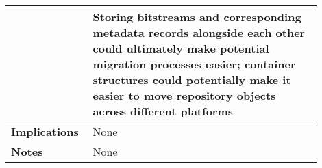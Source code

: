 \begin{longtable}{
>{\arraybackslash}p{0.20\linewidth}|
>{\arraybackslash}p{0.70\linewidth}}
 {\textbf{Rationale}} &
 {Storing bitstreams and corresponding metadata records alongside each other could ultimately make potential migration processes easier; container structures could potentially make it easier to move repository objects across different platforms} \\
 \cline{1-2}

 {\textbf{Implications}} &
 {None} \\
 \cline{1-2}

 {\textbf{Notes}} &
 {None} \\

 \end{longtable}
